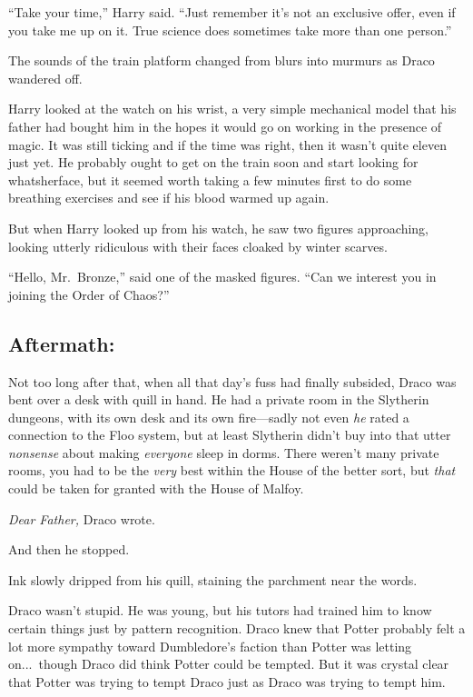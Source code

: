 “Take your time,” Harry said. “Just remember it’s not an exclusive offer, even if you take me up on it. True science does sometimes take more than one person.”

The sounds of the train platform changed from blurs into murmurs as Draco wandered off.

Harry looked at the watch on his wrist, a very simple mechanical model that his father had bought him in the hopes it would go on working in the presence of magic. It was still ticking and if the time was right, then it wasn’t quite eleven just yet. He probably ought to get on the train soon and start looking for whatsherface, but it seemed worth taking a few minutes first to do some breathing exercises and see if his blood warmed up again.

But when Harry looked up from his watch, he saw two figures approaching, looking utterly ridiculous with their faces cloaked by winter scarves.

“Hello, Mr.~Bronze,” said one of the masked figures. “Can we interest you in joining the Order of Chaos?”
\replacement{\sbreak}{}

\subsection{Aftermath:}
Not too long after that, when all that day’s fuss had finally subsided, Draco was bent over a desk with quill in hand. He had a private room in the Slytherin dungeons, with its own desk and its own fire—sadly not even \emph{he} rated a connection to the Floo system, but at least Slytherin didn’t buy into that utter \emph{nonsense} about making \emph{everyone} sleep in dorms. There weren’t many private rooms, you had to be the \emph{very} best within the House of the better sort, but \emph{that} could be taken for granted with the House of Malfoy.

\emph{Dear Father,} Draco wrote.

And then he stopped.

Ink slowly dripped from his quill, staining the parchment near the words.

Draco wasn’t stupid. He was young, but his tutors had trained him to know certain things just by pattern recognition. Draco knew that Potter probably felt a lot more sympathy toward Dumbledore’s faction than Potter was letting on...\ though Draco did think Potter could be tempted. But it was crystal clear that Potter was trying to tempt Draco just as Draco was trying to tempt him.

